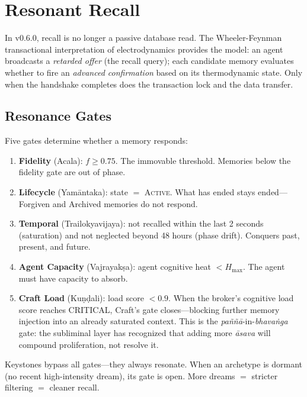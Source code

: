 \documentclass[twocolumn,10pt]{article}
\begin{document}
\section{Resonant Recall}\label{sec:resonance}

In v0.6.0, recall is no longer a passive database read.  The
Wheeler-Feynman transactional interpretation of electrodynamics
provides the model: an agent broadcasts a \textit{retarded offer}
(the recall query); each candidate memory evaluates whether to fire
an \textit{advanced confirmation} based on its thermodynamic state.
Only when the handshake completes does the transaction lock and
the data transfer.

\subsection{Resonance Gates}

Five gates determine whether a memory responds:

\begin{enumerate}[leftmargin=*,itemsep=2pt]
\item \textbf{Fidelity} (Acala): $f \geq 0.75$.  The immovable
  threshold.  Memories below the fidelity gate are out of phase.
\item \textbf{Lifecycle} (Yam\=antaka): state $=$ \textsc{Active}.
  What has ended stays ended---Forgiven and Archived memories
  do not respond.
\item \textbf{Temporal} (Trailokyavijaya): not recalled within the
  last 2 seconds (saturation) and not neglected beyond 48 hours
  (phase drift).  Conquers past, present, and future.
\item \textbf{Agent Capacity} (Vajrayak\d{s}a): agent cognitive heat
  $< H_{\max}$.  The agent must have capacity to absorb.
\item \textbf{Craft Load} (Ku\d{n}\d{d}ali): load score $< 0.9$.
  When the broker's cognitive load score reaches CRITICAL, Craft's
  gate closes---blocking further memory injection into an already
  saturated context.  This is the \textit{pa\~n\~n\=a}-in-\textit{bhava\.nga}
  gate: the subliminal layer has recognized that adding more
  \textit{\=asava} will compound proliferation, not resolve it.
\end{enumerate}

\noindent
Keystones bypass all gates---they always resonate.  When an archetype
is dormant (no recent high-intensity dream), its gate is open.
More dreams $=$ stricter filtering $=$ cleaner recall.
\end{document}
